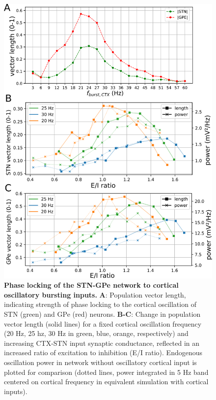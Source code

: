 \begin{figure}
\centering
\includegraphics[height=\dimexpr \textheight - 10\baselineskip\relax]{ch_detailed_model/figs_split/fig_exogenous_resonance-psd-vectorlength_B-vectorlength.png}
\caption{
\textbf{Phase locking of the STN-GPe network to cortical oscillatory bursting inputs.}
\textbf{A}: Population vector length, indicating strength of phase locking to the cortical oscillation of STN (green) and GPe (red) neurons.
\textbf{B-C}: Change in population vector length (solid lines) for a fixed cortical oscillation frequency (20 Hz, 25 hz, 30 Hz in green, blue, orange, respectively) and increasing CTX-STN input synaptic conductance, reflected in an increased ratio of excitation to inhibition (E/I ratio). Endogenous oscillation power in network without oscillatory cortical input is plotted for comparison (dotted lines, power integrated in 5 Hz band centered on cortical frequency in equivalent simulation with cortical inputs). %
}
\label{fig:exogenous_ctx-resonance-response_B-vectorlength}
\end{figure}

